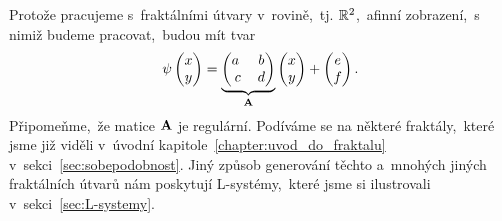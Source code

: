 Protože pracujeme s~fraktálními útvary v~rovině,~tj. $\mathbb{R}^2$,~afinní zobrazení,~s nimiž budeme pracovat,~budou mít tvar
\begin{equation}\label{eq:afinita-v-R2}
    \psi\left(\begin{matrix}
        x\\
        y
    \end{matrix}\right)=\underbrace{\left(\begin{matrix}
        a~& b\\
        c & d
    \end{matrix}\right)}_{\mathbf{A}}\left(\begin{matrix}
        x\\
        y
    \end{matrix}\right)+\left(\begin{matrix}
        e\\
        f
    \end{matrix}\right).
\end{equation}
Připomeňme,~že matice $\mathbf{A}$ je regulární. Podíváme se na některé fraktály,~které jsme již viděli v~úvodní kapitole~\ref{chapter:uvod_do_fraktalu} v~sekci~\ref{sec:sobepodobnost}. Jiný způsob generování těchto a~mnohých jiných fraktálních útvarů nám poskytují L-systémy,~které jsme si ilustrovali v~sekci~\ref{sec:L-systemy}.

